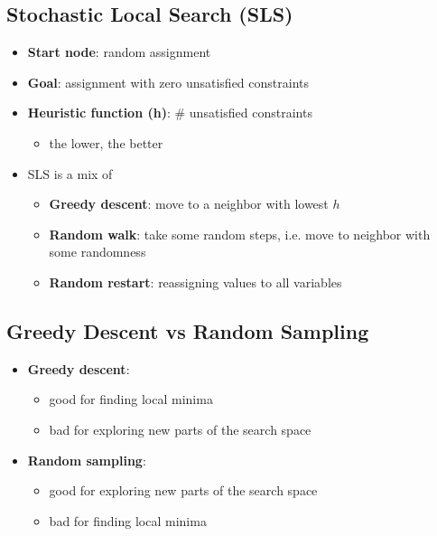 \documentclass{article}
\begin{document}
\subsection{Stochastic Local Search (SLS)}

\begin{itemize}
    \item \textbf{Start node}: random assignment
    \item \textbf{Goal}: assignment with zero unsatisfied constraints
    \item \textbf{Heuristic function (h)}: \# unsatisfied constraints
    \begin{itemize}
        \item the lower, the better
    \end{itemize}
    \item SLS is a mix of 
    \begin{itemize}
        \item \textbf{Greedy descent}: move to a neighbor with lowest $h$
        \item \textbf{Random walk}: take some random steps, i.e. move to neighbor with some randomness
        \item \textbf{Random restart}: reassigning values to all variables
    \end{itemize}
\end{itemize}

\subsection{Greedy Descent vs Random Sampling}

\begin{itemize}
    \item \textbf{Greedy descent}:
        \begin{itemize}
            \item good for finding local minima
            \item bad for exploring new parts of the search space
        \end{itemize}
    \item \textbf{Random sampling}:
        \begin{itemize}
            \item good for exploring new parts of the search space
            \item bad for finding local minima
        \end{itemize}
\end{itemize}
\end{document}
